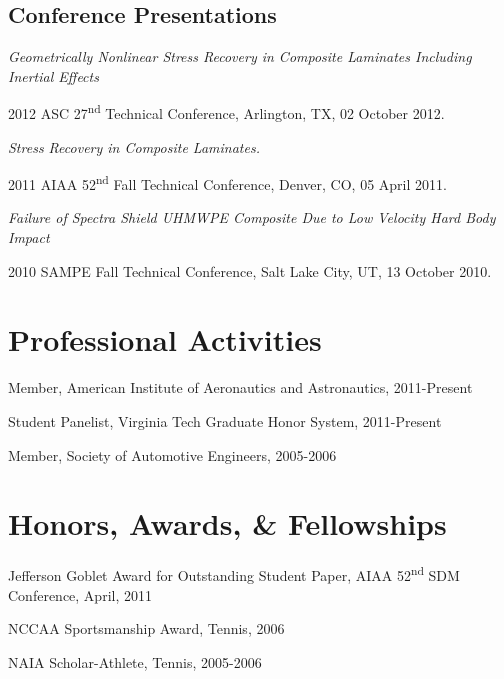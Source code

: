 \documentclass[10pt,letterpaper]{article}
\renewenvironment{itemize}{
  \begin{list}{}{
    \setlength{\leftmargin}{1.5em}
    \setlength{\itemsep}{0.25em}
    \setlength{\parskip}{0pt}
    \setlength{\parsep}{0.25em}
  }
}{
  \end{list}
}
\begin{document}
\subsection*{Conference Presentations}
\begin{itemize}
\item \textit{Geometrically Nonlinear Stress Recovery in Composite Laminates
    Including Inertial Effects}
  \begin{itemize}
  \item 2012 ASC 27\textsuperscript{nd} Technical Conference, Arlington, TX,
    02 October 2012.
  \end{itemize}
\item \textit{Stress Recovery in Composite Laminates.}
  \begin{itemize}
  \item 2011 AIAA 52\textsuperscript{nd} Fall Technical Conference,
    Denver, CO,
    05 April 2011.
  \end{itemize}
\item \textit{Failure of Spectra Shield UHMWPE Composite Due to Low Velocity
    Hard Body Impact}
  \begin{itemize}
  \item 2010 SAMPE Fall Technical Conference,
    Salt Lake City, UT,
    13 October 2010.
  \end{itemize}
\end{itemize}

%
%

\section*{Professional Activities}
\begin{itemize}
\item Member, American Institute of Aeronautics and Astronautics, 2011-Present
\item Student Panelist, Virginia Tech Graduate Honor System, 2011-Present
\item Member, Society of Automotive Engineers, 2005-2006
\end{itemize}

\section*{Honors, Awards, \& Fellowships}

\begin{itemize}
\item Jefferson Goblet Award for Outstanding Student Paper, AIAA 52\textsuperscript{nd} SDM Conference, April, 2011
\item NCCAA Sportsmanship Award, Tennis, 2006
\item NAIA Scholar-Athlete, Tennis, 2005-2006
\end{itemize}
\end{document}
